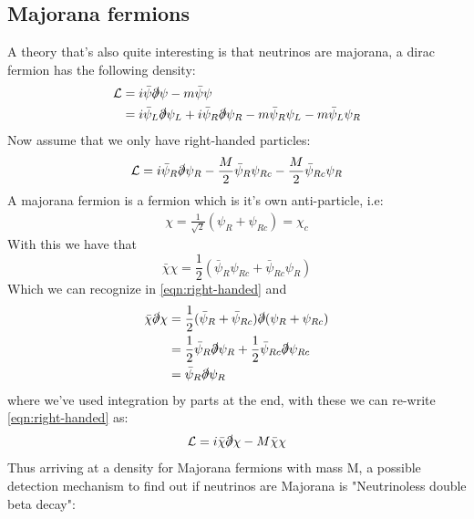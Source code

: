 \documentclass[11pt,a4paper,faculty=we,language=en,doctype=report]{cls/ugent-doc}
\begin{document}
\subsection{Majorana fermions}
A theory that's also quite interesting is that
neutrinos are majorana,
a dirac fermion has the following density:
\begin{align}
  \mathcal{L} &= i\bar{\psi}\slashed{\partial}\psi - m\bar{\psi}\psi\\
              &= i\bar{\psi}_L\slashed{\partial}\psi_L + i\bar{\psi}_R\slashed{\partial}\psi_R - m\bar{\psi}_R\psi_L - m\bar{\psi}_L\psi_R
\end{align}
Now assume that we only have right-handed particles:
\begin{equation}
  \mathcal{L} = i\bar{\psi}_R\slashed{\partial}\psi_R - \frac{M}{2}\bar{\psi}_R\psi_{Rc} - \frac{M}{2}\bar{\psi}_{Rc}\psi_R
\label{eqn:right-handed}
\end{equation}
A majorana fermion is a fermion which is it's own anti-particle, i.e:
\begin{align}
  \chi = \frac{1}{\sqrt{2}}\left( \psi_R + \psi_{Rc}  \right) = \chi_c
\end{align}
With this we have that
\begin{equation}
  \bar{\chi}\chi = \frac{1}{2}\left(\bar{\psi}_R\psi_{Rc} + \bar{\psi}_{Rc}\psi_R\right)
\end{equation}
Which we can recognize in \ref{eqn:right-handed} and
\begin{align}
  \bar{\chi}\slashed{\partial}\chi &= \frac{1}{2}(\bar{\psi}_R + \bar{\psi}_{Rc}) \slashed{\partial}(\psi_R + \psi_{Rc})\\
                                   &= \frac{1}{2} \bar{\psi}_R\slashed{\partial}\psi_R + \frac{1}{2}\bar{\psi}_{Rc}\slashed{\partial}\psi_{Rc}\\
                                   &= \bar{\psi}_R \slashed{\partial}\psi_R
\end{align}
where we've used integration by parts at the end, with these we can re-write \ref{eqn:right-handed} as:
\begin{equation}
  \mathcal{L} = i\bar{\chi}\slashed{\partial}\chi - M \bar{\chi}\chi
\end{equation}
Thus arriving at a density for Majorana fermions with mass M, a possible detection mechanism
to find out if neutrinos are Majorana is "Neutrinoless double beta decay":
\end{document}
